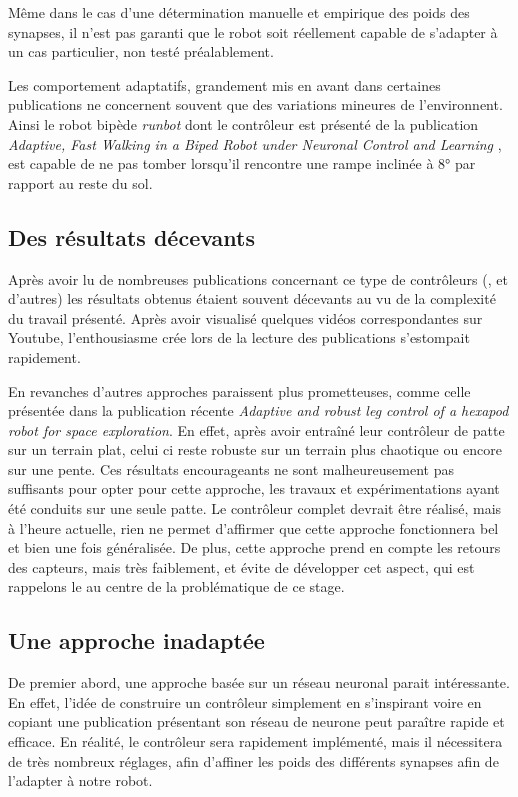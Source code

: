 \documentclass{tnreport}
\begin{document}
Même dans le cas d'une détermination manuelle et empirique des poids des synapses, il n'est pas garanti que le robot soit réellement capable de s'adapter à un cas particulier, non testé préalablement. 

Les comportement adaptatifs, grandement mis en avant dans certaines publications ne concernent souvent que des variations mineures de l'environnent. Ainsi le robot bipède \textit{runbot} dont le contrôleur est présenté de la publication \textit{Adaptive, Fast Walking in a Biped Robot under Neuronal Control and Learning} \cite{manoonpong_runbot_2007}, est capable de ne pas tomber lorsqu'il rencontre une rampe inclinée à 8° par rapport au reste du sol. 

\subsection{Des résultats décevants}\label{lb:rsltpastop}

Après avoir lu de nombreuses publications concernant ce type de contrôleurs (\cite{ren_multiple_2015}, \cite{santos_cpg_2012} et d'autres) les résultats obtenus étaient souvent décevants au vu de la complexité du travail présenté. Après avoir visualisé quelques vidéos correspondantes sur Youtube, l'enthousiasme crée lors de la lecture des publications s'estompait rapidement.

En revanches d'autres approches paraissent plus prometteuses, comme celle présentée dans la publication récente \textit{Adaptive and robust leg control of a
hexapod robot for space exploration}\cite{travaglini_adaptive_2015}. En effet, après avoir entraîné leur contrôleur de patte sur un terrain plat, celui ci reste robuste sur un terrain plus chaotique ou encore sur une pente. Ces résultats encourageants ne sont malheureusement pas suffisants pour opter pour cette approche, les travaux et expérimentations ayant été conduits sur une seule patte. Le contrôleur complet devrait être réalisé, mais à l'heure actuelle, rien ne permet d'affirmer que cette approche fonctionnera bel et bien une fois généralisée. De plus, cette approche prend en compte les retours des capteurs, mais très faiblement, et évite de développer cet aspect, qui est rappelons le au centre de la problématique de ce stage. 

\subsection{Une approche inadaptée}

De premier abord, une approche basée sur un réseau neuronal parait intéressante. En effet, l'idée de construire un contrôleur simplement en s'inspirant voire en copiant une publication présentant son réseau de neurone peut paraître rapide et efficace. En réalité, le contrôleur sera rapidement implémenté, mais il nécessitera de très nombreux réglages, afin d'affiner les poids des différents synapses afin de l'adapter à notre robot. 
\end{document}
